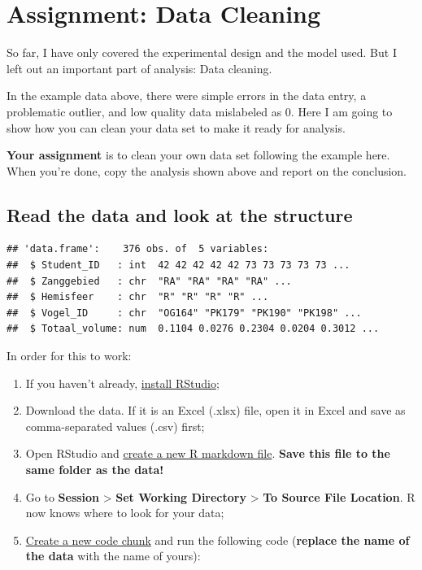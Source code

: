 \documentclass[
]{book}
\providecommand{\tightlist}{%
  \setlength{\itemsep}{0pt}\setlength{\parskip}{0pt}}
\begin{document}
\hypertarget{assignment-data-cleaning}{%
\section{Assignment: Data Cleaning}\label{assignment-data-cleaning}}

So far, I have only covered the experimental design and the model used. But I left out an important part of analysis: Data cleaning.

In the example data above, there were simple errors in the data entry, a problematic outlier, and low quality data mislabeled as \(0\). Here I am going to show how you can clean your data set to make it ready for analysis.

\textbf{Your assignment} is to clean your own data set following the example here. When you're done, copy the analysis shown above and report on the conclusion.

\hypertarget{read-the-data-and-look-at-the-structure}{%
\subsection{Read the data and look at the structure}\label{read-the-data-and-look-at-the-structure}}

\begin{verbatim}
## 'data.frame':    376 obs. of  5 variables:
##  $ Student_ID   : int  42 42 42 42 42 73 73 73 73 73 ...
##  $ Zanggebied   : chr  "RA" "RA" "RA" "RA" ...
##  $ Hemisfeer    : chr  "R" "R" "R" "R" ...
##  $ Vogel_ID     : chr  "OG164" "PK179" "PK190" "PK198" ...
##  $ Totaal_volume: num  0.1104 0.0276 0.2304 0.0204 0.3012 ...
\end{verbatim}

In order for this to work:

\begin{enumerate}
\def\labelenumi{\arabic{enumi}.}
\tightlist
\item
  If you haven't already, \href{https://fransrodenburg.github.io/Biostatistics-Portfolio-I/installation.html}{install RStudio};
\item
  Download the data. If it is an Excel (.xlsx) file, open it in Excel and save as comma-separated values (.csv) first;
\item
  Open RStudio and \href{https://youtu.be/2Sovzf6lVRo?t=280}{create a new R markdown file}. \textbf{Save this file to the same folder as the data!}
\item
  Go to \textbf{Session} \textgreater{} \textbf{Set Working Directory} \textgreater{} \textbf{To Source File Location}. R now knows where to look for your data;
\item
  \href{https://youtu.be/AHAR7j-IUOw?t=357}{Create a new code chunk} and run the following code (\textbf{replace the name of the data} with the name of yours):
\end{enumerate}
\end{document}
